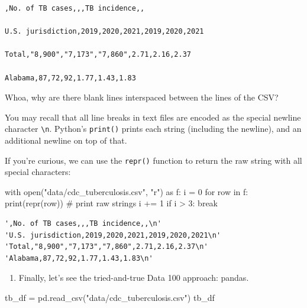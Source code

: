\documentclass[
  letterpaper,
  DIV=11,
  numbers=noendperiod]{scrreprt}
\newenvironment{Shaded}{\begin{snugshade}}{\end{snugshade}}
\newcommand{\BuiltInTok}[1]{\textcolor[rgb]{0.00,0.23,0.31}{#1}}
\newcommand{\CommentTok}[1]{\textcolor[rgb]{0.37,0.37,0.37}{#1}}
\newcommand{\ControlFlowTok}[1]{\textcolor[rgb]{0.00,0.23,0.31}{#1}}
\newcommand{\DecValTok}[1]{\textcolor[rgb]{0.68,0.00,0.00}{#1}}
\newcommand{\ImportTok}[1]{\textcolor[rgb]{0.00,0.46,0.62}{#1}}
\newcommand{\KeywordTok}[1]{\textcolor[rgb]{0.00,0.23,0.31}{#1}}
\newcommand{\NormalTok}[1]{\textcolor[rgb]{0.00,0.23,0.31}{#1}}
\newcommand{\OperatorTok}[1]{\textcolor[rgb]{0.37,0.37,0.37}{#1}}
\newcommand{\StringTok}[1]{\textcolor[rgb]{0.13,0.47,0.30}{#1}}
\providecommand{\tightlist}{%
  \setlength{\itemsep}{0pt}\setlength{\parskip}{0pt}}\usepackage{longtable,booktabs,array}
\begin{document}
\begin{verbatim}
,No. of TB cases,,,TB incidence,,

U.S. jurisdiction,2019,2020,2021,2019,2020,2021

Total,"8,900","7,173","7,860",2.71,2.16,2.37

Alabama,87,72,92,1.77,1.43,1.83
\end{verbatim}

Whoa, why are there blank lines interspaced between the lines of the
CSV?

You may recall that all line breaks in text files are encoded as the
special newline character \texttt{\textbackslash{}n}. Python's
\texttt{print()} prints each string (including the newline), and an
additional newline on top of that.

If you're curious, we can use the \texttt{repr()} function to return the
raw string with all special characters:

\begin{Shaded}
\begin{Highlighting}[]
\ControlFlowTok{with} \BuiltInTok{open}\NormalTok{(}\StringTok{"data/cdc\_tuberculosis.csv"}\NormalTok{, }\StringTok{"r"}\NormalTok{) }\ImportTok{as}\NormalTok{ f:}
\NormalTok{    i }\OperatorTok{=} \DecValTok{0}
    \ControlFlowTok{for}\NormalTok{ row }\KeywordTok{in}\NormalTok{ f:}
        \BuiltInTok{print}\NormalTok{(}\BuiltInTok{repr}\NormalTok{(row)) }\CommentTok{\# print raw strings}
\NormalTok{        i }\OperatorTok{+=} \DecValTok{1}
        \ControlFlowTok{if}\NormalTok{ i }\OperatorTok{\textgreater{}} \DecValTok{3}\NormalTok{:}
            \ControlFlowTok{break}
\end{Highlighting}
\end{Shaded}

\begin{verbatim}
',No. of TB cases,,,TB incidence,,\n'
'U.S. jurisdiction,2019,2020,2021,2019,2020,2021\n'
'Total,"8,900","7,173","7,860",2.71,2.16,2.37\n'
'Alabama,87,72,92,1.77,1.43,1.83\n'
\end{verbatim}

\begin{enumerate}
\def\labelenumi{\arabic{enumi}.}
\setcounter{enumi}{3}
\tightlist
\item
  Finally, let's see the tried-and-true Data 100 approach: pandas.
\end{enumerate}

\begin{Shaded}
\begin{Highlighting}[]
\NormalTok{tb\_df }\OperatorTok{=}\NormalTok{ pd.read\_csv(}\StringTok{"data/cdc\_tuberculosis.csv"}\NormalTok{)}
\NormalTok{tb\_df}
\end{Highlighting}
\end{Shaded}
\end{document}
